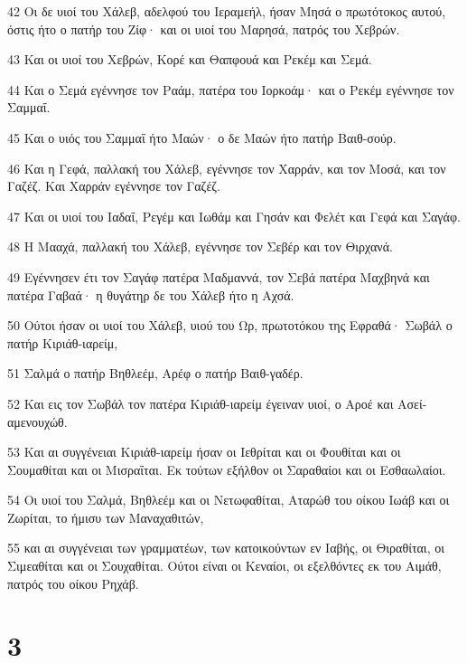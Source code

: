 \par 42 Οι δε υιοί του Χάλεβ, αδελφού του Ιεραμεήλ, ήσαν Μησά ο πρωτότοκος αυτού, όστις ήτο ο πατήρ του Ζίφ· και οι υιοί του Μαρησά, πατρός του Χεβρών.
\par 43 Και οι υιοί του Χεβρών, Κορέ και Θαπφουά και Ρεκέμ και Σεμά.
\par 44 Και ο Σεμά εγέννησε τον Ραάμ, πατέρα του Ιορκοάμ· και ο Ρεκέμ εγέννησε τον Σαμμαΐ.
\par 45 Και ο υιός του Σαμμαΐ ήτο Μαών· ο δε Μαών ήτο πατήρ Βαιθ-σούρ.
\par 46 Και η Γεφά, παλλακή του Χάλεβ, εγέννησε τον Χαρράν, και τον Μοσά, και τον Γαζέζ. Και Χαρράν εγέννησε τον Γαζέζ.
\par 47 Και οι υιοί του Ιαδαΐ, Ρεγέμ και Ιωθάμ και Γησάν και Φελέτ και Γεφά και Σαγάφ.
\par 48 Η Μααχά, παλλακή του Χάλεβ, εγέννησε τον Σεβέρ και τον Θιρχανά.
\par 49 Εγέννησεν έτι τον Σαγάφ πατέρα Μαδμαννά, τον Σεβά πατέρα Μαχβηνά και πατέρα Γαβαά· η θυγάτηρ δε του Χάλεβ ήτο η Αχσά.
\par 50 Ούτοι ήσαν οι υιοί του Χάλεβ, υιού του Ωρ, πρωτοτόκου της Εφραθά· Σωβάλ ο πατήρ Κιριάθ-ιαρείμ,
\par 51 Σαλμά ο πατήρ Βηθλεέμ, Αρέφ ο πατήρ Βαιθ-γαδέρ.
\par 52 Και εις τον Σωβάλ τον πατέρα Κιριάθ-ιαρείμ έγειναν υιοί, ο Αροέ και Ασεί-αμενουχώθ.
\par 53 Και αι συγγένειαι Κιριάθ-ιαρείμ ήσαν οι Ιεθρίται και οι Φουθίται και οι Σουμαθίται και οι Μισραΐται. Εκ τούτων εξήλθον οι Σαραθαίοι και οι Εσθαωλαίοι.
\par 54 Οι υιοί του Σαλμά, Βηθλεέμ και οι Νετωφαθίται, Αταρώθ του οίκου Ιωάβ και οι Ζωρίται, το ήμισυ των Μαναχαθιτών,
\par 55 και αι συγγένειαι των γραμματέων, των κατοικούντων εν Ιαβής, οι Θιραθίται, οι Σιμεαθίται και οι Σουχαθίται. Ούτοι είναι οι Κεναίοι, οι εξελθόντες εκ του Αιμάθ, πατρός του οίκου Ρηχάβ.

\chapter{3}

